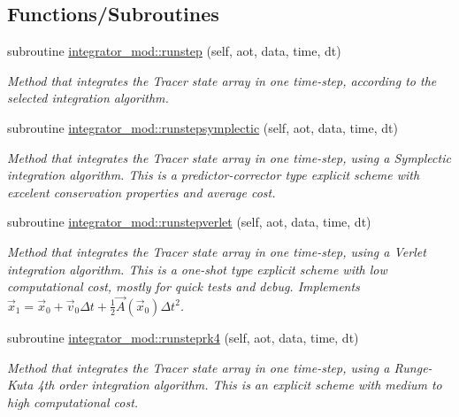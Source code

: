 \subsection*{Functions/\+Subroutines}
\begin{DoxyCompactItemize}
\item 
subroutine \mbox{\hyperlink{namespaceintegrator__mod_a057e4afe510b4382b006005105ca1718}{integrator\+\_\+mod\+::runstep}} (self, aot, data, time, dt)
\begin{DoxyCompactList}\small\item\em Method that integrates the Tracer state array in one time-\/step, according to the selected integration algorithm. \end{DoxyCompactList}\item 
subroutine \mbox{\hyperlink{namespaceintegrator__mod_aa867e98470b3ec97a666099e8258b6ef}{integrator\+\_\+mod\+::runstepsymplectic}} (self, aot, data, time, dt)
\begin{DoxyCompactList}\small\item\em Method that integrates the Tracer state array in one time-\/step, using a Symplectic integration algorithm. This is a predictor-\/corrector type explicit scheme with excelent conservation properties and average cost. \end{DoxyCompactList}\item 
subroutine \mbox{\hyperlink{namespaceintegrator__mod_af53e2642a8984c3841ae6085704f7b8d}{integrator\+\_\+mod\+::runstepverlet}} (self, aot, data, time, dt)
\begin{DoxyCompactList}\small\item\em Method that integrates the Tracer state array in one time-\/step, using a Verlet integration algorithm. This is a one-\/shot type explicit scheme with low computational cost, mostly for quick tests and debug. Implements $ {\vec {x}}_{1}={\vec {x}}_{0}+{\vec {v}}_{0}\Delta t+{\frac {1}{2}}{\vec {A}}({\vec {x}}_{0})\Delta t^{2}$. \end{DoxyCompactList}\item 
subroutine \mbox{\hyperlink{namespaceintegrator__mod_a5041a009a45095be904f30377c509e7e}{integrator\+\_\+mod\+::runsteprk4}} (self, aot, data, time, dt)
\begin{DoxyCompactList}\small\item\em Method that integrates the Tracer state array in one time-\/step, using a Runge-\/\+Kuta 4th order integration algorithm. This is an explicit scheme with medium to high computational cost. \end{DoxyCompactList}\item 

\end{DoxyCompactItemize}
